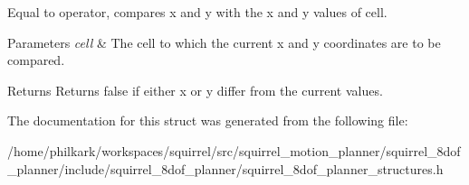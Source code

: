 Equal to operator, compares x and y with the x and y values of cell. 


\begin{DoxyParams}{Parameters}
{\em cell} & The cell to which the current x and y coordinates are to be compared. \\
\hline
\end{DoxyParams}
\begin{DoxyReturn}{Returns}
Returns false if either x or y differ from the current values. 
\end{DoxyReturn}


The documentation for this struct was generated from the following file\-:\begin{DoxyCompactItemize}
\item 
/home/philkark/workspaces/squirrel/src/squirrel\-\_\-motion\-\_\-planner/squirrel\-\_\-8dof\-\_\-planner/include/squirrel\-\_\-8dof\-\_\-planner/squirrel\-\_\-8dof\-\_\-planner\-\_\-structures.\-h\end{DoxyCompactItemize}
